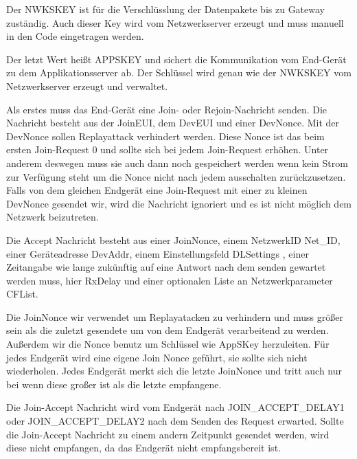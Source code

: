\documentclass[a4paper,12pt]{article}
\begin{document}
                Der NWKSKEY ist für die Verschlüsslung der Datenpakete bis zu Gateway zuständig. Auch dieser Key wird 
                vom Netzwerkserver erzeugt und muss manuell in den Code eingetragen werden.\cite[S.3]{LoRaSecur}
            
                Der letzt Wert heißt APPSKEY und sichert die Kommunikation vom End-Gerät zu dem Applikationsserver ab. 
                Der Schlüssel wird genau wie der NWKSKEY vom Netzwerkserver erzeugt und verwaltet.\cite[S.3]{LoRaSecur}

                Als erstes muss das End-Gerät eine Join- oder Rejoin-Nachricht senden. Die Nachricht besteht aus der 
                JoinEUI, dem DevEUI und einer DevNonce. Mit der DevNonce sollen Replayattack verhindert werden. Diese 
                Nonce ist das beim ersten Join-Request 0 und sollte sich bei jedem Join-Request erhöhen. Unter anderem 
                deswegen muss sie auch dann noch gespeichert werden wenn kein Strom zur Verfügung steht um die Nonce 
                nicht nach jedem ausschalten zurückzusetzen. Falls von dem gleichen Endgerät eine Join-Request mit einer 
                zu kleinen DevNonce gesendet wir, wird die Nachricht ignoriert und es ist nicht möglich dem Netzwerk 
                beizutreten.

                Die Accept Nachricht besteht aus einer JoinNonce, einem NetzwerkID Net\_ID, einer Geräteadresse DevAddr,
                einem Einstellungsfeld DLSettings , einer Zeitangabe wie lange zukünftig auf eine Antwort nach dem
                senden gewartet werden muss, hier RxDelay und einer optionalen Liste an Netzwerkparameter CFList.

                Die JoinNonce wir verwendet um Replayatacken zu verhindern und muss größer sein als die zuletzt 
                gesendete um von dem Endgerät verarbeitend zu werden. Außerdem wir die Nonce benutz um Schlüssel wie 
                AppSKey herzuleiten. Für jedes Endgerät wird eine eigene Join Nonce geführt, sie sollte sich nicht 
                wiederholen. Jedes Endgerät merkt sich die letzte JoinNonce und tritt auch nur bei wenn diese großer 
                ist als die letzte empfangene.

                Die Join-Accept Nachricht wird vom Endgerät nach JOIN\_ACCEPT\_DELAY1 oder JOIN\_ACCEPT\_DELAY2 nach 
                dem Senden des Request erwarted. Sollte die Join-Accept Nachricht zu einem andern Zeitpunkt gesendet 
                werden, wird diese nicht empfangen, da das Endgerät nicht empfangsbereit ist.
\end{document}
